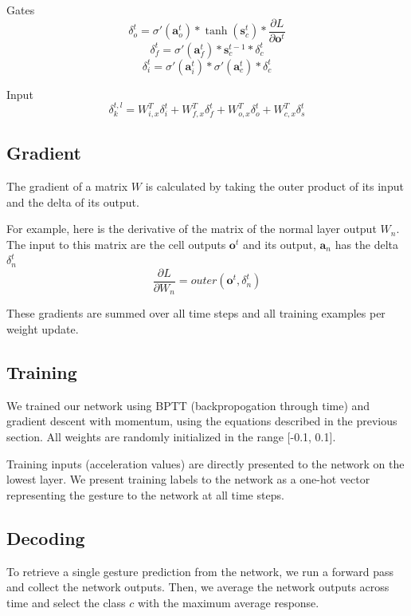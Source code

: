 \documentclass[11pt]{article}
\begin{document}
Gates
\[ \delta_{o}^{t} = \sigma'(\textbf{a}_{o}^{t}) * \tanh( \textbf{s}_{c}^{t}) * \frac{\partial L}{\partial \textbf{o}^{t}} \]
\[ \delta_{f}^{t} = \sigma'(\textbf{a}_{f}^{t}) * \textbf{s}_{c}^{t-1} * \delta_{c}^{t} \]
\[ \delta_{i}^{t} = \sigma'(\textbf{a}_{i}^{t}) * \sigma'( \textbf{a}_{c}^{t}) * \delta_{c}^{t} \]

Input
\[  \delta_{k}^{t,l} = W_{i,x}^{T}\delta_{i}^{t} +  W_{f,x}^{T}\delta_{f}^{t} +  W_{o,x}^{T}\delta_{o}^{t} +  W_{c,x}^{T}\delta_{s}^{t} \]

\subsection{Gradient}

The gradient of a matrix \(W\) is calculated by
taking the outer product of its input and the delta
of its output.

For example, here is the derivative of the matrix of
the normal layer output \(W_{n}\). The input to
this matrix are the cell outputs \(\textbf{o}^{t}\) and
its output, \(\textbf{a}_{n}\) has the delta \(\delta_{n}^{t}\)
\[ \frac{\partial L}{\partial W_{n}} = outer(\textbf{o}^{t}, \delta_{n}^{t} ) \]

These gradients are summed over all time steps and
all training examples per weight update.

\subsection{Training}

We trained our network using BPTT (backpropogation through time) and
gradient descent with momentum, using the equations described in
the previous section. All weights are randomly initialized
in the range [-0.1, 0.1].

Training inputs (acceleration values) are directly presented to
the network on the lowest layer. We present training labels 
to the network as a one-hot vector representing the
gesture to the network at all time steps.

\subsection{Decoding}

To retrieve a single gesture prediction from the network,
we run a forward pass and collect the network outputs. 
Then, we average the network outputs
across time and select the class \(c\) with the maximum average response.
\end{document}
